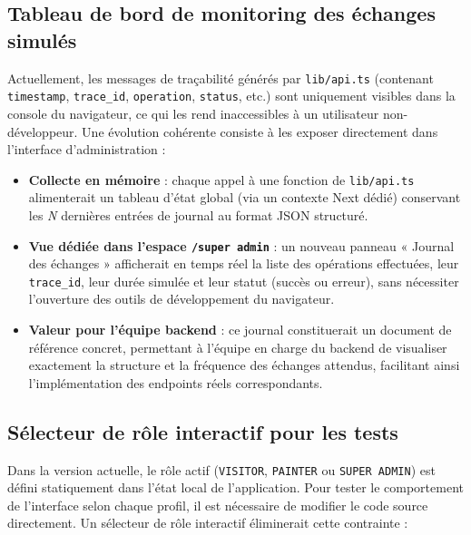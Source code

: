 \documentclass[12pt,a4paper]{report}
\begin{document}
\subsection{Tableau de bord de monitoring des échanges simulés}

Actuellement, les messages de traçabilité générés par \texttt{lib/api.ts} (contenant \texttt{timestamp}, \texttt{trace\_id}, \texttt{operation}, \texttt{status}, etc.) sont uniquement visibles dans la console du navigateur, ce qui les rend inaccessibles à un utilisateur non-développeur. Une évolution cohérente consiste à les exposer directement dans l'interface d'administration :

\begin{itemize}
    \item \textbf{Collecte en mémoire} : chaque appel à une fonction de \texttt{lib/api.ts} alimenterait un tableau d'état global (via un contexte Next dédié) conservant les \textit{N} dernières entrées de journal au format JSON structuré.
    
    \item \textbf{Vue dédiée dans l'espace \texttt{/super admin}} : un nouveau panneau « Journal des échanges » afficherait en temps réel la liste des opérations effectuées, leur \texttt{trace\_id}, leur durée simulée et leur statut (succès ou erreur), sans nécessiter l'ouverture des outils de développement du navigateur.
    
    \item \textbf{Valeur pour l'équipe backend} : ce journal constituerait un document de référence concret, permettant à l'équipe en charge du backend de visualiser exactement la structure et la fréquence des échanges attendus, facilitant ainsi l'implémentation des endpoints réels correspondants.
\end{itemize}

\subsection{Sélecteur de rôle interactif pour les tests}

Dans la version actuelle, le rôle actif (\texttt{VISITOR}, \texttt{PAINTER} ou \texttt{SUPER ADMIN}) est défini statiquement dans l'état local de l'application. Pour tester le comportement de l'interface selon chaque profil, il est nécessaire de modifier le code source directement. Un sélecteur de rôle interactif éliminerait cette contrainte :
\end{document}
